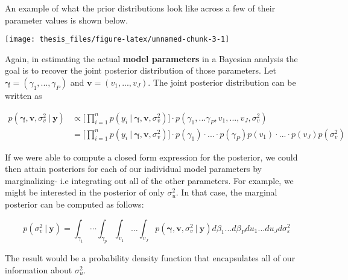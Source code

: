 \documentclass[12pt,twoside]{reedthesis}
\begin{document}
An example of what the prior distributions look like across a few of their parameter values is shown below.
\begin{center}\texttt{[image: thesis\_files/figure-latex/unnamed-chunk-3-1]} \end{center}

Again, in estimating the actual \textbf{model parameters} in a Bayesian analysis the goal is to recover the joint posterior distribution of those parameters. Let \(\boldsymbol{\gamma} = (\gamma_1, ...,\gamma_P)\) and \(\mathbf{v} = (v_1, ..., v_J)\). The joint posterior distribution can be written as

\[
\begin{aligned}
p(\boldsymbol{\gamma}, \mathbf{v},  \sigma_v^2 \ | \ \mathbf{y}) &\propto \bigg[\prod_{i=1}^np(y_i \ | \ \boldsymbol{\gamma}, \mathbf{v},  \sigma_v^2)\bigg]\cdot p(\gamma_1, ...\gamma_P, v_1,... ,v_J, \sigma_v^2) \\
 &= \bigg[\prod_{i=1}^np(y_i \ | \ \boldsymbol{\gamma}, \mathbf{v},  \sigma_v^2)\bigg]\cdot p(\gamma_1)\cdot...\cdot p(\gamma_P)p(v_1) \cdot ... \cdot p(v_J)p(\sigma_v^2)
\end{aligned}
\]

If we were able to compute a closed form expression for the posterior, we could then attain posteriors for each of our individual model parameters by marginalizing- i.e integrating out all of the other parameters. For example, we might be interested in the posterior of only \(\sigma_u^2\). In that case, the marginal posterior can be computed as follows:

\[
p(\sigma_v^2 \ | \ \mathbf{y}) = \int_{\gamma_1} \cdots \int_{\gamma_p} \int_{v_1} \dots \int_{v_J} p(\boldsymbol{\gamma}, \mathbf{v},  \sigma_v^2 \ | \ \mathbf{y}) d\beta_1 ... d\beta_P du_1 ... du_Jd\sigma_{\varepsilon}^2
\]

The result would be a probability density function that encapsulates all of our information about \(\sigma_u^2\).
\end{document}
